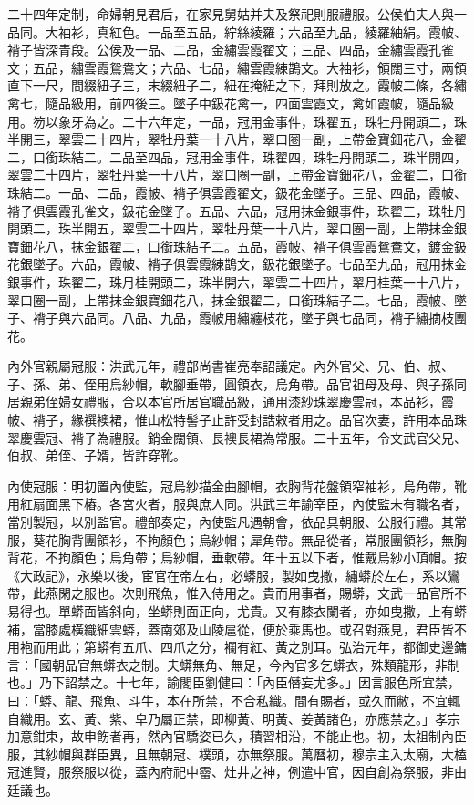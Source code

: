 二十四年定制，命婦朝見君后，在家見舅姑并夫及祭祀則服禮服。公侯伯夫人與一品同。大袖衫，真紅色。一品至五品，紵絲綾羅；六品至九品，綾羅紬絹。霞帔、褙子皆深青段。公侯及一品、二品，金繡雲霞翟文；三品、四品，金繡雲霞孔雀文；五品，繡雲霞鴛鴦文；六品、七品，繡雲霞練鵲文。大袖衫，領闊三寸，兩領直下一尺，間綴紐子三，末綴紐子二，紐在掩紐之下，拜則放之。霞帔二條，各繡禽七，隨品級用，前四後三。墜子中鈒花禽一，四面雲霞文，禽如霞帔，隨品級用。笏以象牙為之。二十六年定，一品，冠用金事件，珠翟五，珠牡丹開頭二，珠半開三，翠雲二十四片，翠牡丹葉一十八片，翠口圈一副，上帶金寶鈿花八，金翟二，口銜珠結二。二品至四品，冠用金事件，珠翟四，珠牡丹開頭二，珠半開四，翠雲二十四片，翠牡丹葉一十八片，翠口圈一副，上帶金寶鈿花八，金翟二，口銜珠結二。一品、二品，霞帔、褙子俱雲霞翟文，鈒花金墜子。三品、四品，霞帔、褙子俱雲霞孔雀文，鈒花金墜子。五品、六品，冠用抹金銀事件，珠翟三，珠牡丹開頭二，珠半開五，翠雲二十四片，翠牡丹葉一十八片，翠口圈一副，上帶抹金銀寶鈿花八，抹金銀翟二，口銜珠結子二。五品，霞帔、褙子俱雲霞鴛鴦文，鍍金鈒花銀墜子。六品，霞帔、褙子俱雲霞練鵲文，鈒花銀墜子。七品至九品，冠用抹金銀事件，珠翟二，珠月桂開頭二，珠半開六，翠雲二十四片，翠月桂葉一十八片，翠口圈一副，上帶抹金銀寶鈿花八，抹金銀翟二，口銜珠結子二。七品，霞帔、墜子、褙子與六品同。八品、九品，霞帔用繡纏枝花，墜子與七品同，褙子繡摘枝團花。

內外官親屬冠服：洪武元年，禮部尚書崔亮奉詔議定。內外官父、兄、伯、叔、子、孫、弟、侄用烏紗帽，軟腳垂帶，圓領衣，烏角帶。品官祖母及母、與子孫同居親弟侄婦女禮服，合以本官所居官職品級，通用漆紗珠翠慶雲冠，本品衫，霞帔、褙子，緣襈襖裙，惟山松特髻子止許受封誥敕者用之。品官次妻，許用本品珠翠慶雲冠、褙子為禮服。銷金闊領、長襖長裙為常服。二十五年，令文武官父兄、伯叔、弟侄、子婿，皆許穿靴。

內使冠服：明初置內使監，冠烏紗描金曲腳帽，衣胸背花盤領窄袖衫，烏角帶，靴用紅扇面黑下樁。各宮火者，服與庶人同。洪武三年諭宰臣，內使監未有職名者，當別製冠，以別監官。禮部奏定，內使監凡遇朝會，依品具朝服、公服行禮。其常服，葵花胸背團領衫，不拘顏色；烏紗帽；犀角帶。無品從者，常服團領衫，無胸背花，不拘顏色；烏角帶；烏紗帽，垂軟帶。年十五以下者，惟戴烏紗小頂帽。按《大政記》，永樂以後，宦官在帝左右，必蟒服，製如曳撒，繡蟒於左右，系以鸞帶，此燕閑之服也。次則飛魚，惟入侍用之。貴而用事者，賜蟒，文武一品官所不易得也。單蟒面皆斜向，坐蟒則面正向，尤貴。又有膝衣闌者，亦如曳撒，上有蟒補，當膝處橫織細雲蟒，蓋南郊及山陵扈從，便於乘馬也。或召對燕見，君臣皆不用袍而用此；第蟒有五爪、四爪之分，襴有紅、黃之別耳。弘治元年，都御史邊鏞言：「國朝品官無蟒衣之制。夫蟒無角、無足，今內官多乞蟒衣，殊類龍形，非制也。」乃下詔禁之。十七年，諭閣臣劉健曰：「內臣僭妄尤多。」因言服色所宜禁，曰：「蟒、龍、飛魚、斗牛，本在所禁，不合私織。間有賜者，或久而敝，不宜輒自織用。玄、黃、紫、皁乃屬正禁，即柳黃、明黃、姜黃諸色，亦應禁之。」孝宗加意鉗束，故申飭者再，然內官驕姿已久，積習相沿，不能止也。初，太祖制內臣服，其紗帽與群臣異，且無朝冠、襆頭，亦無祭服。萬曆初，穆宗主入太廟，大榼冠進賢，服祭服以從，蓋內府祀中霤、灶井之神，例遣中官，因自創為祭服，非由廷議也。

